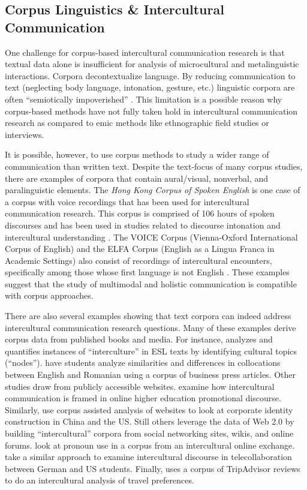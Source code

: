 \subsection{Corpus Linguistics \& Intercultural Communication}

One challenge for corpus-based intercultural communication research is that textual data alone is insufficient for analysis of microcultural and metalinguistic interactions. Corpora decontextualize language. By reducing communication to text (neglecting body language, intonation, gesture, etc.) linguistic corpora are often ``semiotically impoverished'' \citep[34]{Mautner2009a}. This limitation is a possible reason why corpus-based methods have not fully taken hold in intercultural communication research as compared to emic methods like ethnographic field studies or interviews.	

It is possible, however, to use corpus methods to study a wider range of communication than written text. Despite the text-focus of many corpus studies, there are examples of corpora that contain aural/visual, nonverbal, and paralinguistic elements. The \textit{Hong Kong Corpus of Spoken English} \citep{Cheng2005a} is one case of a corpus with voice recordings that has been used for intercultural communication research. This corpus is comprised of 106 hours of spoken discourses and has been used in studies related to discourse intonation and intercultural understanding \citep[e.g.,][]{Cheng2007a}. The VOICE Corpus (Vienna-Oxford International Corpus of English) and the ELFA Corpus (English as a Lingua Franca in Academic Settings) also consist of recordings of intercultural encounters, specifically among those whose first language is not English  \citep[118]{Lee2010a}. These examples suggest that the study of multimodal and holistic communication is compatible with corpus approaches.

There are also several examples showing that text corpora can indeed address intercultural communication research questions. Many of these examples derive corpus data from published books and media. For instance, \cite*{Almujaiwel2018a} analyzes and quantifies instances of ``interculture'' in ESL texts by identifying cultural topics (``nodes''). \cite*{Popescu2013a} have students analyze similarities and differences in collocations between English and Romanian using a corpus of business press articles. Other studies draw from publicly accessible websites. \cite{Hua2017a} examine how intercultural communication is framed in online higher education promotional discourse. Similarly, \cite{Ming2015a} use corpus assisted analysis of websites to look at corporate identity construction in China and the US. Still others leverage the data of Web 2.0 by building ``intercultural'' corpora from social networking sites, wikis, and online forums. \cite*{Orsini-Jones2016a} look at pronoun use in a corpus from an intercultural online exchange. \cite*{Ryshina-Pankova2018a} take a similar approach to examine intercultural discourse in telecollaboration between German and US students. Finally, \cite*{Fina2011a} uses a corpus of TripAdvisor reviews to do an intercultural analysis of travel preferences.

